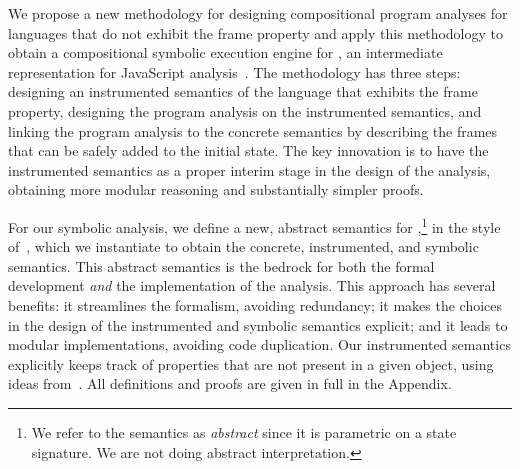 
We propose a new methodology for designing compositional program analyses for languages that do not exhibit the frame property and apply this methodology to obtain a compositional symbolic execution engine for \jsil, an intermediate representation for JavaScript analysis~\cite{javert}. 
%
%
The methodology has three steps:  designing an instrumented semantics of the language that exhibits the frame property,  designing the program  analysis on the instrumented semantics, and  linking the program analysis to the concrete semantics by describing the frames that can be safely added to the initial state.   
%
The key innovation is to have the instrumented semantics as a proper interim stage in the design of the analysis, obtaining 
more modular reasoning and substantially simpler proofs.

For our symbolic analysis, we define a new, abstract semantics for \jsil,\footnote{We refer to the semantics as \emph{abstract} since it 
is parametric on a \jsil state signature. We are not doing abstract interpretation.} in the style of~\cite{vanhorn:icfp:2010}, which we instantiate to obtain the concrete, instrumented, and symbolic semantics. 
This abstract semantics is the bedrock for both the formal development \emph{and} the implementation of the analysis. This approach has several benefits: it streamlines the formalism, avoiding redundancy; it makes the choices in the design of the instrumented and symbolic semantics explicit; and it leads to modular implementations, avoiding code duplication.
%
Our instrumented semantics explicitly keeps track of properties that are not present in a given object, using ideas from~\cite{gardner:popl:2012,javert}. All definitions and proofs are given in full in the Appendix.


